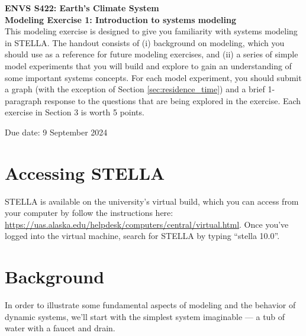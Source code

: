 \documentclass[11pt,letterpaper]{article}
\begin{document}
\textbf{ENVS S422: Earth's Climate System\\
Modeling Exercise 1: Introduction to systems modeling}\\

This modeling exercise is designed to give you familiarity with systems modeling in STELLA. The handout consists of (i) background on modeling, which you should use as a reference for future modeling exercises, and (ii) a series of simple model experiments that you will build and explore to gain an understanding of some important systems concepts. For each model experiment, you should submit a graph (with the exception of Section \ref{sec:residence_time}) and a brief 1-paragraph response to the questions that are being explored in the exercise. Each exercise in Section 3 is worth 5 points.

Due date: 9 September 2024

\section{Accessing STELLA}
STELLA is available on the university's virtual build, which you can access from your computer by follow the instructions here: \url{https://uas.alaska.edu/helpdesk/computers/central/virtual.html}. Once you've logged into the virtual machine, search for STELLA by typing ``stella 10.0''. 

\section{Background}
In order to illustrate some fundamental aspects of modeling and the behavior of dynamic systems, we'll start with the simplest system imaginable --- a tub of water with a faucet and drain.
\end{document}
